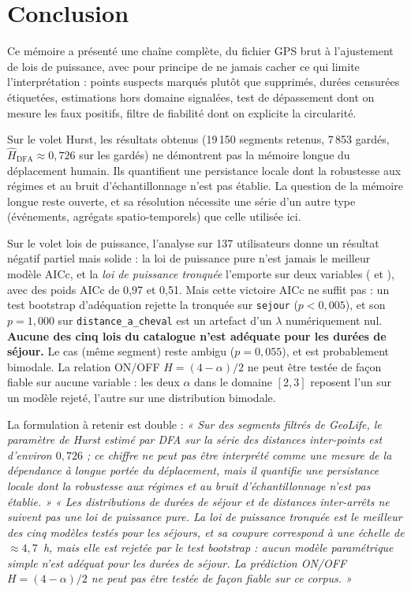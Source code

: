 \documentclass[12pt,a4paper]{report}
\theoremstyle{definition}
\DeclareRobustCommand{\code}[1]{\texorpdfstring{\texttt{\detokenize{#1}}}{\detokenize{#1}}}
\begin{document}
\chapter*{Conclusion}

Ce mémoire a présenté une chaîne complète, du fichier GPS brut à l'ajustement de lois de
puissance, avec pour principe de ne jamais cacher ce qui limite l'interprétation : points
suspects marqués plutôt que supprimés, durées censurées étiquetées, estimations hors
domaine signalées, test de dépassement dont on mesure les faux positifs, filtre de
fiabilité dont on explicite la circularité.

Sur le volet Hurst, les résultats obtenus (19\,150 segments retenus, 7\,853 gardés,
$\hat H_{\mathrm{DFA}} \approx 0{,}726$ sur les gardés) ne démontrent pas la mémoire longue
du déplacement humain. Ils quantifient une persistance locale dont la robustesse aux
régimes et au bruit d'échantillonnage n'est pas établie. La question de la mémoire longue
reste ouverte, et sa résolution nécessite une série d'un autre type (événements, agrégats
spatio-temporels) que celle utilisée ici.

Sur le volet lois de puissance, l'analyse sur 137 utilisateurs donne un résultat négatif
partiel mais solide : la loi de puissance pure n'est jamais le meilleur modèle AICc, et la
\emph{loi de puissance tronquée} l'emporte sur deux variables (\code{sejour} et
\code{distance_a_cheval}), avec des poids AICc de 0{,}97 et 0{,}51. Mais cette victoire
AICc ne suffit pas : un test bootstrap d'adéquation rejette la tronquée sur
\texttt{sejour} ($p<0{,}005$), et son $p=1{,}000$ sur \texttt{distance\_a\_cheval} est un
artefact d'un $\lambda$ numériquement nul. \textbf{Aucune des cinq lois du catalogue n'est
adéquate pour les durées de séjour.} Le cas \code{distance} (même segment) reste ambigu
($p=0{,}055$), et \code{sejour_avec_censurees} est probablement bimodale. La relation
ON/OFF $H=(4-\alpha)/2$ ne peut être testée de façon fiable sur aucune variable : les deux
$\alpha$ dans le domaine $[2,3]$ reposent l'un sur un modèle rejeté, l'autre sur une
distribution bimodale.

La formulation à retenir est double :
\emph{« Sur des segments filtrés de GeoLife, le paramètre de Hurst estimé par DFA sur la
série des distances inter-points est d'environ $0{,}726$ ; ce chiffre ne peut pas être
interprété comme une mesure de la dépendance à longue portée du déplacement, mais il
quantifie une persistance locale dont la robustesse aux régimes et au bruit
d'échantillonnage n'est pas établie. »}
\emph{« Les distributions de durées de séjour et de distances inter-arrêts ne suivent pas
une loi de puissance pure. La loi de puissance tronquée est le meilleur des cinq modèles
testés pour les séjours, et sa coupure correspond à une échelle de $\approx 4{,}7$~h, mais
elle est rejetée par le test bootstrap : aucun modèle paramétrique simple n'est adéquat
pour les durées de séjour. La prédiction ON/OFF $H=(4-\alpha)/2$ ne peut pas être testée
de façon fiable sur ce corpus. »}
\end{document}
